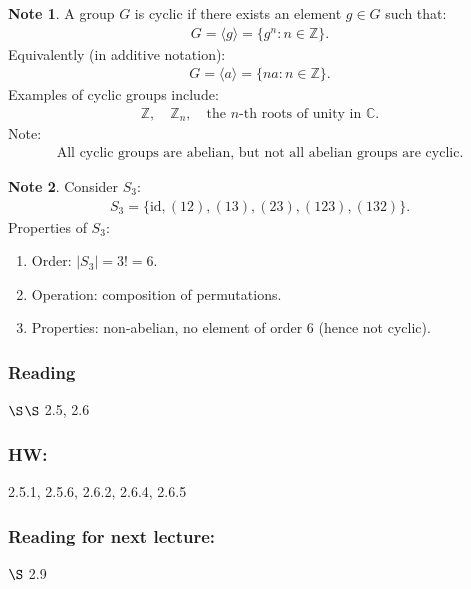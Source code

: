 \documentclass[12pt]{article}
\theoremstyle{definition} %
\newtheorem{note}{Note}
\theoremstyle{plain} %
\begin{document}
\begin{note}
    A group $ G $ is cyclic if there exists an element $ g \in G $ such that:
    \begin{align}
        G = \langle g \rangle = \{ g^n : n \in \mathbb{Z} \}.
    \end{align}
    Equivalently (in additive notation):
    \begin{align}
        G = \langle a \rangle = \{ na : n \in \mathbb{Z} \}.
    \end{align}
    Examples of cyclic groups include:
    \begin{align}
        \mathbb{Z}, \quad \mathbb{Z}_n, \quad \text{the } n\text{-th roots of unity in } \mathbb{C}.
    \end{align}
    Note:
    \begin{align}
        \text{All cyclic groups are abelian, but not all abelian groups are cyclic.}
    \end{align}
\end{note}

\begin{note}
    Consider $ S_3 $:
    \begin{align}
        S_3 = \{\mathrm{id}, (12), (13), (23), (123), (132)\}.
    \end{align}
    Properties of $ S_3 $:
    \begin{enumerate}
        \item Order: $ |S_3| = 3! = 6 $.
        \item Operation: composition of permutations.
        \item Properties: non-abelian, no element of order $6$ (hence not cyclic).
    \end{enumerate}
\end{note}


\subsubsection*{Reading} $\S$$\S$  2.5, 2.6
\subsubsection*{HW:} 2.5.1, 2.5.6, 2.6.2, 2.6.4, 2.6.5

\subsubsection*{Reading for next lecture:} $\S$ 2.9
\end{document}
